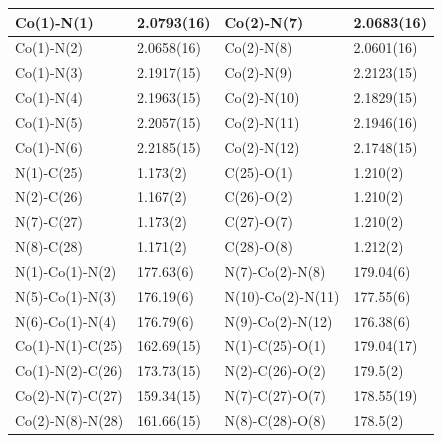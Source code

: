 \begin{table}
\centering
{}
\begin{tabular}{|l|l|l|l|}
\hline
Co(1)-N(1) & 2.0793(16) & Co(2)-N(7) & 2.0683(16)\\
\hline
Co(1)-N(2) & 2.0658(16) & Co(2)-N(8) & 2.0601(16)\\
\hline
Co(1)-N(3) & 2.1917(15) & Co(2)-N(9) & 2.2123(15)\\
\hline
Co(1)-N(4) & 2.1963(15) & Co(2)-N(10) & 2.1829(15)\\
\hline
Co(1)-N(5) & 2.2057(15) & Co(2)-N(11) & 2.1946(16)\\
\hline
Co(1)-N(6) & 2.2185(15) & Co(2)-N(12) & 2.1748(15)\\
\hline
N(1)-C(25) & 1.173(2) & C(25)-O(1) & 1.210(2)\\
\hline
N(2)-C(26) & 1.167(2) & C(26)-O(2) & 1.210(2)\\
\hline
N(7)-C(27) & 1.173(2) & C(27)-O(7) & 1.210(2)\\
\hline
N(8)-C(28) & 1.171(2) & C(28)-O(8) & 1.212(2)\\
\hline
\hline
N(1)-Co(1)-N(2) & 177.63(6) & N(7)-Co(2)-N(8) & 179.04(6)\\
\hline
N(5)-Co(1)-N(3) & 176.19(6) & N(10)-Co(2)-N(11) & 177.55(6)\\
\hline
N(6)-Co(1)-N(4) & 176.79(6) & N(9)-Co(2)-N(12) & 176.38(6)\\
\hline
Co(1)-N(1)-C(25) & 162.69(15) & N(1)-C(25)-O(1) & 179.04(17)\\
\hline
Co(1)-N(2)-C(26) & 173.73(15) & N(2)-C(26)-O(2) & 179.5(2)\\
\hline
Co(2)-N(7)-C(27) & 159.34(15) & N(7)-C(27)-O(7) & 178.55(19)\\
\hline
Co(2)-N(8)-N(28) & 161.66(15) & N(8)-C(28)-O(8) & 178.5(2)\\
\hline
\end{tabular}
\label{batlb:CoO4MOP}
\end{table}


